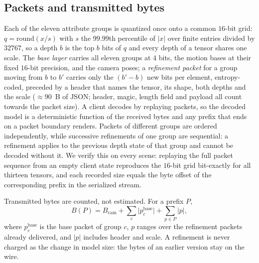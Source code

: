 \documentclass[lettersize,journal]{IEEEtran}
\begin{document}
\subsection{Packets and transmitted bytes}
\label{sec:packets}
Each of the eleven attribute groups is quantized once onto a common $16$-bit grid:
$q=\mathrm{round}(x/s)$ with $s$ the $99.99$th percentile of $|x|$ over finite
entries divided by $32767$, so a depth $b$ is the top $b$ bits of $q$ and every
depth of a tensor shares one scale. The \emph{base layer} carries all eleven
groups at $4$ bits, the motion bases at their fixed $16$-bit precision, and the
camera poses; a \emph{refinement packet} for a group moving from $b$ to $b'$
carries only the $(b'-b)$ new bits per element, entropy-coded, preceded by a
header that names the tensor, its shape, both depths and the scale ($\approx90$~B
of JSON; header, magic, length field and payload all count towards the packet
size). A client decodes by replaying packets, so the decoded model
is a deterministic function of the received bytes and any prefix that ends on a
packet boundary renders. Packets of different groups are ordered independently,
while successive refinements of one group are sequential: a refinement applies to
the previous depth state of that group and cannot be decoded without it. We verify this on every scene: replaying the full packet
sequence from an empty client state reproduces the $16$-bit grid bit-exactly for
all thirteen tensors, and each recorded size equals the byte offset of the
corresponding prefix in the serialized stream.

Transmitted bytes are counted, not estimated. For a prefix $P$,
\begin{equation}
\label{eq:bytes}
B(P)=B_{\text{cam}}+\sum_{c}\bigl|p^{\text{base}}_{c}\bigr|+\sum_{p\in P}|p|,
\end{equation}
where $p^{\text{base}}_c$ is the base packet of group $c$, $p$ ranges over the
refinement packets already delivered, and $|p|$ includes header and scale. A
refinement is never charged as the change in model size: the bytes of an earlier
version stay on the wire.
\end{document}
